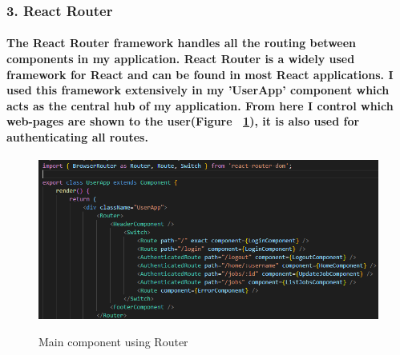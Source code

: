 \subsubsection{3. React Router}
\paragraph{The React Router framework handles all the routing between components in my application. React Router is a widely used framework for React and can be found in most React applications. I used this framework extensively in my 'UserApp' component which acts as the central hub of my application. From here I control which web-pages are shown to the user(Figure ~\ref{router_label}), it is also used for authenticating all routes.}
\begin{figure}[h]
    \centering
    \includegraphics[scale=0.35]{Images/router.png} 
    \label{router_label}
    \caption{Main component using Router}
\end{figure}